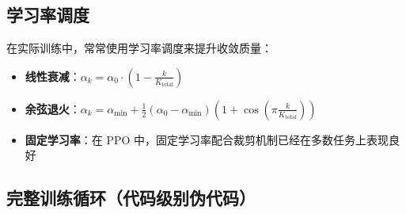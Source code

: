 \subsection{学习率调度}

在实际训练中，常常使用学习率调度来提升收敛质量：

\begin{itemize}
    \item \textbf{线性衰减}：$\alpha_k = \alpha_0 \cdot (1 - \frac{k}{K_{\text{total}}})$
    \item \textbf{余弦退火}：$\alpha_k = \alpha_{\min} + \frac{1}{2}(\alpha_0 - \alpha_{\min})(1 + \cos(\pi \frac{k}{K_{\text{total}}}))$
    \item \textbf{固定学习率}：在 PPO 中，固定学习率配合裁剪机制已经在多数任务上表现良好
\end{itemize}

\subsection{完整训练循环（代码级别伪代码）}

